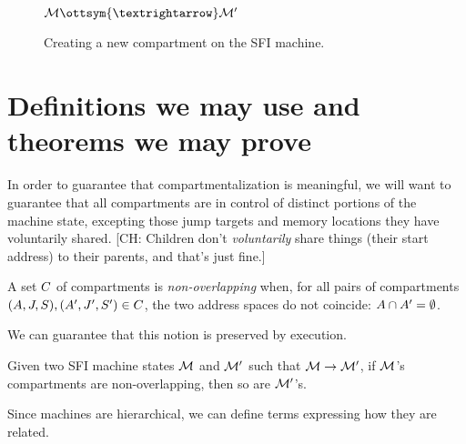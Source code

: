 \documentclass[12pt]{amsart}
\newif\ifdraft\drafttrue
\newcommand*{\term}[1]{\emph{#1}}
\newcommand{\comm}[3]{\ifdraft\textcolor{#1}{[#2: #3]}\fi}
\newcommand{\ch}[1]{\comm{dkgreen}{CH}{#1}} %
\begin{document}
\begin{figure}
  \begin{ottdefnblock}{$\mathcal{M} \ottsym{→} \mathcal{M}'$}
                      {}
    \ottusedrule{\ottdrulestepXXisolate{}}
  \end{ottdefnblock}\vspace{-\baselineskip}
  \caption{Creating a new compartment on the SFI machine.}
  \label{fig:sfi-step-isolate}
\end{figure}

\section{Definitions we may use and theorems we may prove}

In order to guarantee that compartmentalization is meaningful, we will want to
guarantee that all compartments are in control of distinct portions of the
machine state, excepting those jump targets and memory locations they have
voluntarily shared.
%
\ch{Children don't {\em voluntarily} share things (their start
  address) to their parents, and that's just fine.}

\begin{definition}\label{def:non-overlapping}
  A set $C$ of compartments is \term{non-overlapping} when, for all
  pairs of compartments $(A, J, S),
  (A', J', S') \in C$, the two
  address spaces do not coincide: $A \cap A' =
  \emptyset$.
\end{definition}

We can guarantee that this notion is preserved by execution.

\begin{lemma}
\label{lem:non-overlapping}
  Given two SFI machine states $\mathcal{M}$ and $\mathcal{M}'$ such that $\mathcal{M}
  \to \mathcal{M}'$, if $\mathcal{M}$'s compartments are non-overlapping, then so
  are $\mathcal{M}'$'s.
\end{lemma}

Since machines are hierarchical, we can define terms expressing how they are
related.
\end{document}
